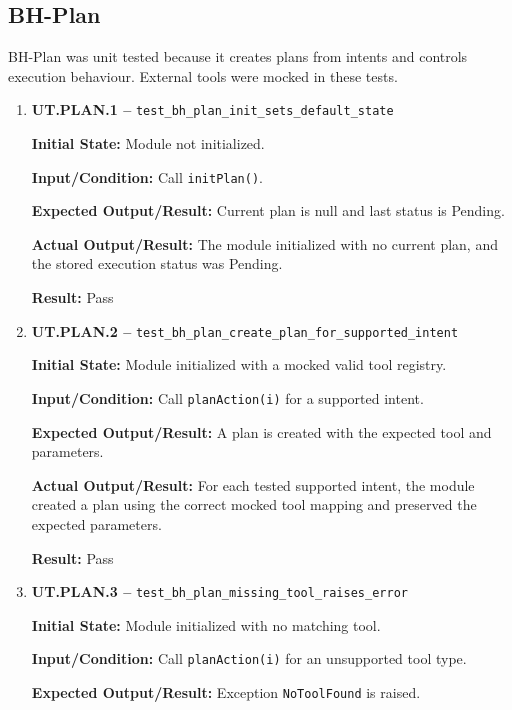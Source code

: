 \documentclass[12pt]{article}
\begin{document}
\subsection{BH-Plan}

BH-Plan was unit tested because it creates plans from intents and
controls execution behaviour. External tools were mocked in these
tests.

\begin{enumerate}
    \item \textbf{UT.PLAN.1 --}
    \texttt{test\_bh\_plan\_init\_sets\_default\_state}
    
    \textbf{Initial State:} Module not initialized.
    
    \textbf{Input/Condition:} Call \texttt{initPlan()}.
    
    \textbf{Expected Output/Result:} Current plan is null and last
    status is Pending.
    
    \textbf{Actual Output/Result:} The module initialized with no
    current plan, and the stored execution status was Pending.
    
    \textbf{Result:} Pass
    
    \item \textbf{UT.PLAN.2 --}
    \texttt{test\_bh\_plan\_create\_plan\_for\_supported\_intent}
    
    \textbf{Initial State:} Module initialized with a mocked valid
    tool registry.
    
    \textbf{Input/Condition:} Call \texttt{planAction(i)} for a
    supported intent.
    
    \textbf{Expected Output/Result:} A plan is created with the
    expected tool and parameters.
    
    \textbf{Actual Output/Result:} For each tested supported intent,
    the module created a plan using the correct mocked tool mapping and
    preserved the expected parameters.
    
    \textbf{Result:} Pass
    
    \item \textbf{UT.PLAN.3 --}
    \texttt{test\_bh\_plan\_missing\_tool\_raises\_error}
    
    \textbf{Initial State:} Module initialized with no matching tool.
    
    \textbf{Input/Condition:} Call \texttt{planAction(i)} for an
    unsupported tool type.
    
    \textbf{Expected Output/Result:} Exception \texttt{NoToolFound} is
    raised.
    

\end{enumerate}
\end{document}
